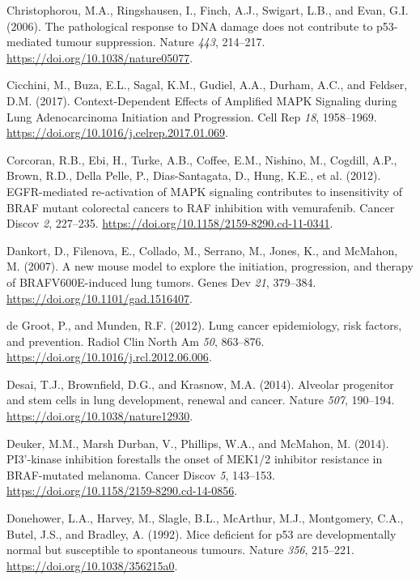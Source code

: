 \begin{CSLReferences}{0}{0}
\leavevmode{}%
Christophorou, M.A., Ringshausen, I., Finch, A.J., Swigart, L.B., and Evan, G.I. (2006). The pathological response to DNA damage does not contribute to p53-mediated tumour suppression. Nature \emph{443}, 214--217. \url{https://doi.org/10.1038/nature05077}.

\leavevmode{}%
Cicchini, M., Buza, E.L., Sagal, K.M., Gudiel, A.A., Durham, A.C., and Feldser, D.M. (2017). Context-Dependent Effects of Amplified MAPK Signaling during Lung Adenocarcinoma Initiation and Progression. Cell Rep \emph{18}, 1958--1969. \url{https://doi.org/10.1016/j.celrep.2017.01.069}.

\leavevmode{}%
Corcoran, R.B., Ebi, H., Turke, A.B., Coffee, E.M., Nishino, M., Cogdill, A.P., Brown, R.D., Della Pelle, P., Dias-Santagata, D., Hung, K.E., et al. (2012). EGFR-mediated re-activation of MAPK signaling contributes to insensitivity of BRAF mutant colorectal cancers to RAF inhibition with vemurafenib. Cancer Discov \emph{2}, 227--235. \url{https://doi.org/10.1158/2159-8290.cd-11-0341}.

\leavevmode{}%
Dankort, D., Filenova, E., Collado, M., Serrano, M., Jones, K., and McMahon, M. (2007). A new mouse model to explore the initiation, progression, and therapy of BRAFV600E-induced lung tumors. Genes Dev \emph{21}, 379--384. \url{https://doi.org/10.1101/gad.1516407}.

\leavevmode{}%
de Groot, P., and Munden, R.F. (2012). Lung cancer epidemiology, risk factors, and prevention. Radiol Clin North Am \emph{50}, 863--876. \url{https://doi.org/10.1016/j.rcl.2012.06.006}.

\leavevmode{}%
Desai, T.J., Brownfield, D.G., and Krasnow, M.A. (2014). Alveolar progenitor and stem cells in lung development, renewal and cancer. Nature \emph{507}, 190--194. \url{https://doi.org/10.1038/nature12930}.

\leavevmode{}%
Deuker, M.M., Marsh Durban, V., Phillips, W.A., and McMahon, M. (2014). PI3'-kinase inhibition forestalls the onset of MEK1/2 inhibitor resistance in BRAF-mutated melanoma. Cancer Discov \emph{5}, 143--153. \url{https://doi.org/10.1158/2159-8290.cd-14-0856}.

\leavevmode{}%
Donehower, L.A., Harvey, M., Slagle, B.L., McArthur, M.J., Montgomery, C.A., Butel, J.S., and Bradley, A. (1992). Mice deficient for p53 are developmentally normal but susceptible to spontaneous tumours. Nature \emph{356}, 215--221. \url{https://doi.org/10.1038/356215a0}.


\end{CSLReferences}
